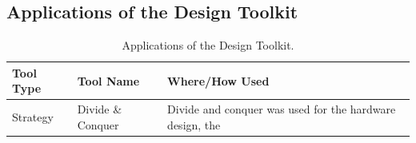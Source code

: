 \documentclass[twoside]{article}
\begin{document}
\newpage
\begin{appendices}
    \section{Applications of the Design Toolkit}
        \begin{table}[h]
            \centering
            \caption{Applications of the Design Toolkit.} \label{table:designtoolkit}
            \begin{tabularx}{\linewidth}{l l X}
                \toprule
                Tool Type & Tool Name & Where/How Used \\
                \midrule
                Strategy & Divide \& Conquer & Divide and conquer was used for the hardware design, the 
                \bottomrule
            \end{tabularx}
        \end{table}
    \newpage

\end{appendices}
\end{document}
